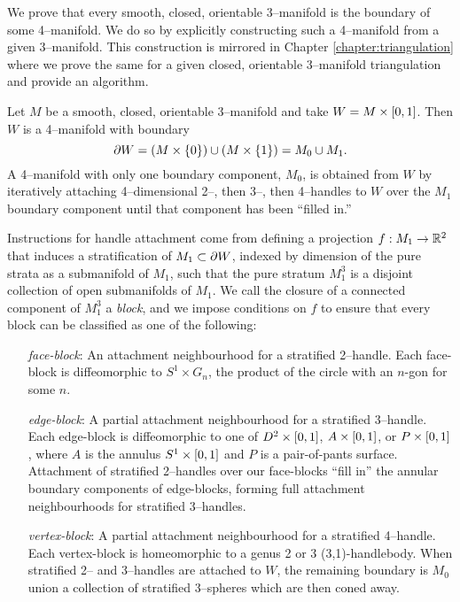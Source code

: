 \label{chapter:smooth}

We prove that every smooth, closed, orientable 3--manifold is the boundary of some 4--manifold.
We do so by explicitly constructing such a 4--manifold from a given 3--manifold.
This construction is mirrored in Chapter \ref{chapter:triangulation} where we prove the same for a given closed, orientable 3--manifold triangulation and provide an algorithm.

Let $M$ be a smooth, closed, orientable 3--manifold and take $W=M\times [0,1]$.
Then $W$ is a 4--manifold with boundary
\[
	\partial W = (M\times\{0\}) \cup (M\times\{1\}) = M_0 \cup M_1.
\]
A 4--manifold with only one boundary component, $M_0$, is obtained from $W$ by iteratively attaching 4--dimensional 2--, then 3--, then 4--handles to $W$ over the $M_1$ boundary component until that component has been ``filled in.''

Instructions for handle attachment come from defining a projection $f:M_1\to \mathbb{R}^2$ that induces a stratification of $M_1\subset\partial W$, indexed by dimension of the pure strata as a submanifold of $M_1$, such that the pure stratum $M_1^3$ is a disjoint collection of open submanifolds of $M_1$.
We call the closure of a connected component of $M_1^3$ a \emph{block}, and we impose conditions on $f$ to ensure that every block can be classified as one of the following:
\begin{enumerate}
	\item[\emph{face-block}:]
		An attachment neighbourhood for a stratified 2--handle.
		Each face-block is diffeomorphic to $S^1\times G_n$, the product of the circle with an $n$-gon for some $n$.
	
	\item[\emph{edge-block}:]
		A partial attachment neighbourhood for a stratified 3--handle.
		Each edge-block is diffeomorphic to one of $D^2\times[0,1]$, $A\times[0,1]$, or $P\times[0,1]$, where $A$ is the annulus $S^1\times[0,1]$ and $P$ is a pair-of-pants surface.
		Attachment of stratified 2--handles over our face-blocks ``fill in'' the annular boundary components of edge-blocks, forming full attachment neighbourhoods for stratified 3--handles.
		
	\item[\emph{vertex-block}:]
		A partial attachment neighbourhood for a stratified 4--handle.
		Each vertex-block is homeomorphic to a genus 2 or 3 (3,1)-handlebody.
		When stratified 2-- and 3--handles are attached to $W$, the remaining boundary is $M_0$ union a collection of stratified 3--spheres which are then coned away.
\end{enumerate}
 
